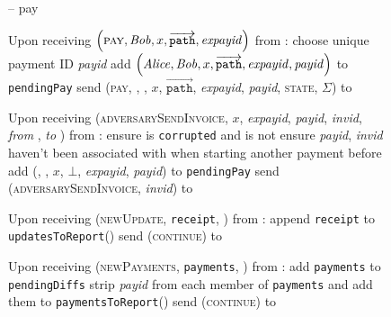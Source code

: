   \begin{figure}[H]
    \begin{systembox}{\fpaynet{} -- pay}
      \begin{algorithmic}[1]
        \State Upon receiving $\left(\textsc{pay}, \mathit{Bob}, x,
        \overrightarrow{\mathtt{path}}, \mathit{expayid}\right)$ from
        \alice:
        \Indent
          \State choose unique payment ID \textit{payid}
          \State add $\left(\mathit{Alice}, \mathit{Bob}, x, \overrightarrow{\mathtt{path}},
          \mathit{expayid}, \mathit{payid}\right)$ to
          \texttt{pendingPay}
          \State send (\textsc{pay}, \alice, \bob, $x$,
          $\overrightarrow{\mathtt{path}}$, \textit{expayid},
          \textit{payid}, \textsc{state}, $\Sigma$) to \simulator
          \label{alg:fpaynet:pay:send}
        \EndIndent
        \Statex

        \State Upon receiving (\textsc{adversarySendInvoice}, $x$,
        \textit{expayid}, \textit{payid}, \textit{invid}, \textit{from} \alice,
        \textit{to} \bob) from \simulator:
        \label{alg:fpaynet:invoice:adv}
        \Indent
          \State ensure \alice{} is \texttt{corrupted} and \bob{} is not
          \State ensure \textit{payid}, \textit{invid} haven't been associated
          with \alice{} when starting another payment before
          \State add (\alice, \bob, $x$, $\bot$, \textit{expayid},
          \textit{payid}) to \texttt{pendingPay}
          \State send (\textsc{adversarySendInvoice}, \textit{invid}) to
          \simulator
          \label{alg:fpaynet:invoice:adv:send}
        \EndIndent
        \Statex

        \State Upon receiving (\textsc{newUpdate}, \texttt{receipt},
        \alice) from \simulator:
        \label{alg:fpaynet:update}
        \Indent
          \State append \texttt{receipt} to
          \texttt{updatesToReport}(\alice) 
          \label{alg:fpaynet:update:add}
          \State send (\textsc{continue}) to \simulator
        \EndIndent
        \Statex

        \State Upon receiving (\textsc{newPayments}, \texttt{payments},
        \alice) from \simulator:
        \label{alg:fpaynet:payments}
        \Indent
          \State add \texttt{payments} to \texttt{pendingDiffs}
          \label{alg:fpaynet:payments:add:pendingdiffs}
          \State strip \textit{payid} from each member of \texttt{payments} and
          add them to \texttt{paymentsToReport}(\alice)
          \State send (\textsc{continue}) to \simulator
        \EndIndent
      \end{algorithmic}
    \end{systembox}
    \caption{}
    \label{alg:fpaynet:pay}
  \end{figure}

